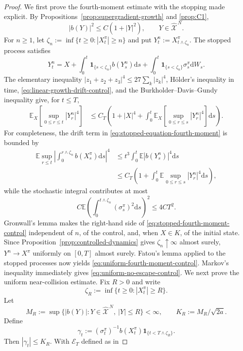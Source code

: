 \documentclass[11pt]{article}
\def\E{\mathbb{E}}
\def\Xc{{\mathcal X}}
\def\id{\mathbf{1}}
\def\hX{\widehat{\Xc}^{\,N}}
\newcommand{\dd}{\mathrm{d}}
\theoremstyle{definition}
\theoremstyle{remark}
\numberwithin{equation}{section}
\begin{document}
\begin{proof}
We first prove the fourth-moment estimate with the stopping made explicit.  By
Propositions~\ref{prop:supergradient-growth} and \ref{prop:C1},
\begin{equation}\label{eq:linear-growth-drift-control}
 |b(Y)|^2\le C(1+|Y|^2),
 \qquad Y\in\hX.
\end{equation}
For $n\ge1$, let
$\zeta_n:=\inf\{t\ge0:|X_t^\pi|\ge n\}$ and put
$Y_t^n:=X_{t\wedge\zeta_n}^\pi$.  The stopped process satisfies
\begin{equation}\label{eq:stopped-equation-fourth-moment}
 Y_t^n
 =X+\int_0^t\id_{\{s<\zeta_n\}}b(Y_s^n)\dd s
 +\int_0^t\id_{\{s<\zeta_n\}}\sigma_s^\pi\dd W_s.
\end{equation}
The elementary inequality $|z_1+z_2+z_3|^4\le27\sum_k|z_k|^4$, H\"older's inequality in time,
\eqref{eq:linear-growth-drift-control}, and the Burkholder--Davis--Gundy inequality give, for
$t\le T$,
\begin{align}
 \E_X\left[\sup_{0\le r\le t}|Y_r^n|^4\right]
 &\le C_T\left(1+|X|^4+
 \int_0^t\E_X\left[\sup_{0\le r\le s}|Y_r^n|^4\right]\dd s\right).
 \label{eq:stopped-fourth-moment-control}
\end{align}
For completeness, the drift term in \eqref{eq:stopped-equation-fourth-moment} is bounded by
\begin{align*}
 \E\sup_{r\le t}\left|\int_0^{r\wedge\zeta_n}b(X_s^\pi)\dd s\right|^4
 &\le t^3\int_0^t\E|b(Y_s^n)|^4\dd s\\
 &\le C_T\left(1+\int_0^t
 \E\sup_{0\le r\le s}|Y_r^n|^4\dd s\right),
\end{align*}
while the stochastic integral contributes at most
\[
 C\E\left(\int_0^{t\wedge\zeta_n}(\sigma_s^\pi)^2\dd s\right)^2
 \le4CT^2.
\]
Gronwall's lemma makes the right-hand side of
\eqref{eq:stopped-fourth-moment-control} independent of $n$, of the control, and, when $X\in K$, of
the initial state.  Since Proposition~\ref{prop:controlled-dynamics} gives
$\zeta_n\uparrow\infty$ almost surely, $Y^n\to X^\pi$ uniformly on $[0,T]$ almost surely.  Fatou's
lemma applied to the stopped processes now yields \eqref{eq:uniform-fourth-moment-control}.
Markov's inequality immediately gives \eqref{eq:uniform-no-escape-control}.
We next prove the uniform near-collision estimate.  Fix $R>0$ and write
\[
 \zeta_R:=\inf\{t\ge0:|X_t^\pi|\ge R\}.
\]
Let
\[
 M_R:=\sup\{|b(Y)|:Y\in\hX,\ |Y|\le R\}<\infty,
 \qquad
 K_R:=M_R/\sqrt{2a}.
\]
Define
\[
 \gamma_t:=(\sigma_t^\pi)^{-1}b(X_t^\pi)
 \id_{\{t<T\wedge\zeta_R\}}.
\]
Then $|\gamma_t|\le K_R$.  With $\mathcal E_T$ defined as in

\end{proof}
\end{document}
